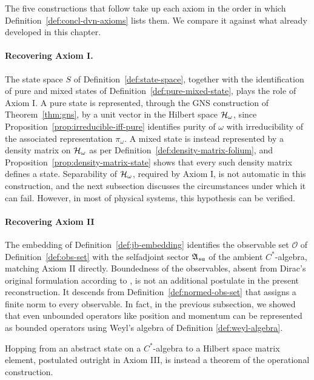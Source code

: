 	\noindent The five constructions that follow take up each axiom in the order in which Definition~\ref{def:concl-dvn-axioms} lists them. We compare it against what already developed in this chapter. 
	
	\paragraph{Recovering Axiom I.}\label{rem:concl-axiom-i} The state space $S$ of Definition~\ref{def:state-space}, together with the identification of pure and mixed states of Definition~\ref{def:pure-mixed-state}, plays the role of Axiom I. A pure state is represented, through the GNS construction of Theorem~\ref{thm:gns}, by a unit vector in the Hilbert space $\H_\omega$, since Proposition~\ref{prop:irreducible-iff-pure} identifies purity of $\omega$ with irreducibility of the associated representation $\pi_\omega$. A mixed state is instead represented by a density matrix on $\H_\omega$ as per Definition~\ref{def:density-matrix-folium}, and Proposition~\ref{prop:density-matrix-state} shows that every such density matrix defines a state. Separability of $\H_\omega$, required by Axiom I, is not automatic in this construction, and the next subsection discusses the circumstances under which it can fail. However, in most of physical systems, this hypothesis can be verified.
	
	\paragraph{Recovering Axiom II}\label{rem:concl-axiom-ii}
		The embedding of Definition~\ref{def:jb-embedding} identifies the observable set $\mathcal{O}$ of Definition~\ref{def:obs-set} with the selfadjoint sector $\mathfrak{A}_{sa}$ of the ambient $C^*$-algebra, matching Axiom II directly. Boundedness of the observables, absent from Dirac's original formulation according to \cite[Sect.~3.6]{strocchiIntroductionMathematicalStructure2005}, is not an additional postulate in the present reconstruction. It descends from Definition~\ref{def:normed-obs-set} that assigns a finite norm to every observable. In fact, in the previous subsection, we showed that even unbounded operators like position and momentum can be represented as bounded operators using Weyl's algebra of Definition \ref{def:weyl-algebra}.
	
	\noindent Hopping from an abstract state on a $C^*$-algebra to a Hilbert space matrix element, postulated outright in Axiom III, is instead a theorem of the operational construction. 
	
